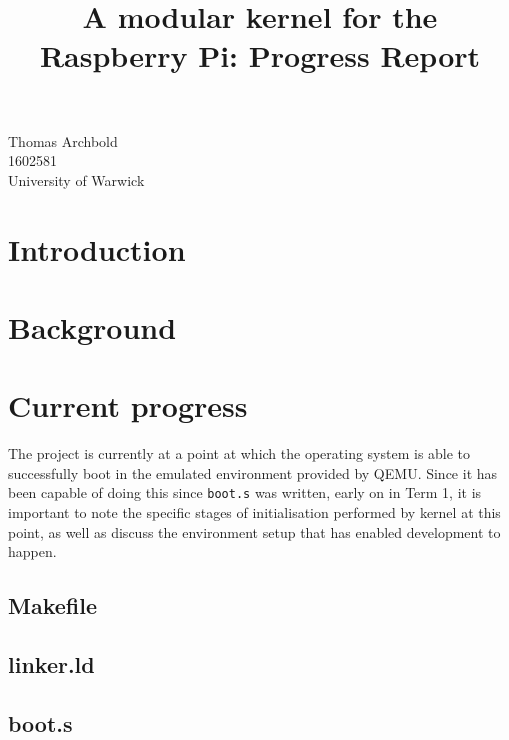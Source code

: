 \documentclass[10pt,a4paper]{article}
\title{A modular kernel for the Raspberry Pi: Progress Report}
\newcommand{\code}[1]{\texttt{#1}}
\begin{document}
\maketitle

\begin{center}
    Thomas Archbold \\
    1602581 \\
    University of Warwick \\
\end{center}

\section{Introduction}

\section{Background}

\section{Current progress}
The project is currently at a point at which the operating system is able to
successfully boot in the emulated environment provided by QEMU. Since it has
been capable of doing this since \code{boot.s} was written, early on in Term 1,
it is important to note the specific stages of initialisation performed by
kernel at this point, as well as discuss the environment setup that has enabled
development to happen.

\subsection{Makefile}
\subsection{linker.ld}
\subsection{boot.s}
\end{document}
